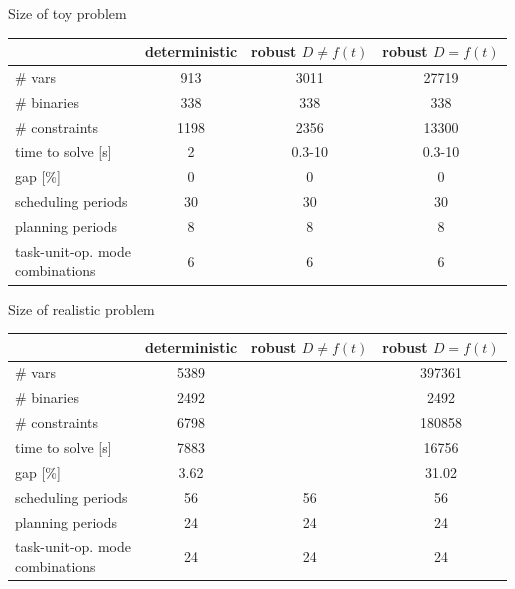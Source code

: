 \documentclass[slides]{beamer}
\begin{document}
\begin{frame}{Size of toy problem}
    \footnotesize
    \centering
    \begin{tabular}{|l|c|c|c|} \hline
         & deterministic & robust $D \neq f(t)$ & robust $D = f(t)$ \\ \hline
        \# vars & 913 & 3011 & 27719\\
        \# binaries & 338 & 338 & 338\\
        \# constraints & 1198 & 2356 & 13300\\ \hline
        time to solve [s] & 2 & 0.3-10 & 0.3-10\\
        gap [\%] & 0 & 0 & 0 \\ \hline
        scheduling periods & 30 & 30 & 30\\
        planning periods & 8 & 8 & 8\\
        \makecell[l]{task-unit-op. mode\\ combinations} & 6 & 6 & 6\\\hline
    \end{tabular}
\end{frame}

\begin{frame}{Size of realistic problem}
    \footnotesize
    \centering
    \begin{tabular}{|l|c|c|c|} \hline
        & deterministic & robust $D \neq f(t)$ & robust $D = f(t)$ \\ \hline
        \# vars & 5389 &  & 397361\\
        \# binaries & 2492 &  & 2492\\
        \# constraints & 6798 & & 180858\\ \hline
        time to solve [s] & 7883 &  & 16756\\
        gap [\%] & 3.62 &  & 31.02\\ \hline
        scheduling periods & 56 & 56 & 56\\
        planning periods & 24 & 24 & 24\\
        \makecell[l]{task-unit-op. mode\\ combinations} & 24 & 24 & 24\\ \hline
    \end{tabular}
\end{frame}
\end{document}
